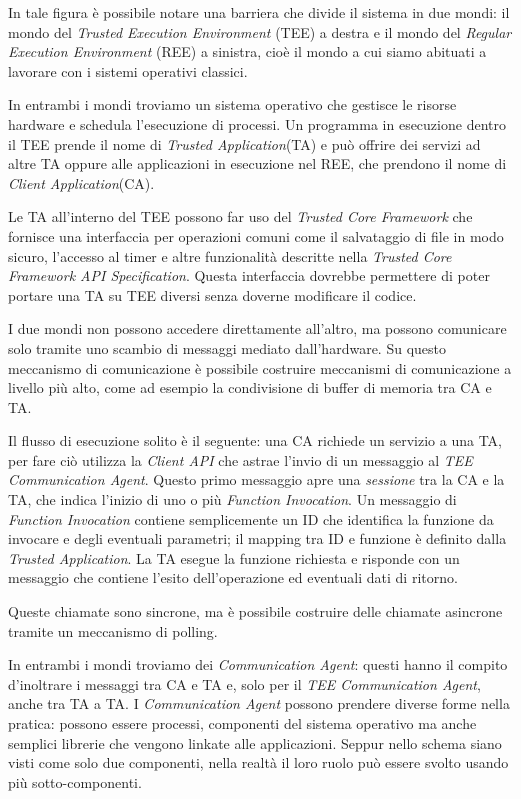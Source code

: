 \documentclass[12pt,italian]{report}
\begin{document}
In tale figura è possibile notare una barriera che divide il sistema in due
mondi: il mondo del \textit{Trusted Execution Environment} (TEE) a destra
e il mondo del \textit{Regular Execution Environment} (REE) a sinistra, cioè
il mondo a cui siamo abituati a lavorare con i sistemi operativi classici.

In entrambi i mondi troviamo un sistema operativo che gestisce le risorse
hardware e schedula l'esecuzione di processi. Un programma in esecuzione
dentro il TEE prende il nome di \textit{Trusted Application}(TA) e può
offrire dei servizi ad altre TA oppure alle applicazioni in esecuzione nel REE,
che prendono il nome di \textit{Client Application}(CA).

Le TA all'interno del TEE possono far uso del \textit{Trusted Core Framework}
che fornisce una interfaccia per operazioni comuni come il salvataggio
di file in modo sicuro, l'accesso al timer e altre funzionalità descritte
nella
\textit{Trusted Core Framework API Specification}\cite{gp2020internalapi}.
Questa interfaccia dovrebbe permettere di poter portare una TA su TEE diversi
senza doverne modificare il codice.

I due mondi non possono accedere direttamente all'altro, ma possono
comunicare solo tramite uno scambio di messaggi mediato dall'hardware.
Su questo meccanismo di comunicazione è possibile costruire meccanismi di
comunicazione a livello più alto, come ad esempio la condivisione di buffer
di memoria tra CA e TA.

\bigbreak \noindent

Il flusso di esecuzione solito è il seguente: una CA richiede un servizio a
una TA, per fare ciò utilizza la \textit{Client API} che astrae l'invio di un
messaggio al \textit{TEE Communication Agent}.
Questo primo messaggio apre una \textit{sessione} tra la CA e la TA, che
indica l'inizio di uno o più \textit{Function Invocation}.
Un messaggio di \textit{Function Invocation} contiene semplicemente un ID
che identifica la funzione da invocare e degli eventuali parametri;
il mapping tra ID e funzione è definito dalla \textit{Trusted Application}.
La TA esegue la funzione richiesta e risponde con un messaggio che contiene
l'esito dell'operazione ed eventuali dati di ritorno.

Queste chiamate sono sincrone, ma è possibile costruire delle chiamate
asincrone tramite un meccanismo di polling.

In entrambi i mondi troviamo dei \textit{Communication Agent}: questi 
hanno il compito d'inoltrare i messaggi tra CA e TA e, solo per il
\textit{TEE Communication Agent}, anche tra TA a TA.
I \textit{Communication Agent} possono prendere diverse forme nella pratica:
possono essere processi, componenti del sistema operativo ma anche semplici
librerie che vengono linkate alle applicazioni.
Seppur nello schema siano visti come solo due componenti, nella realtà il loro
ruolo può essere svolto usando più sotto-componenti.
\end{document}
